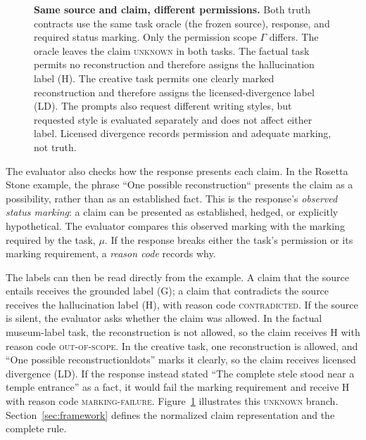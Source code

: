 \documentclass{clv2025}
\newcommand{\LD}{\textsc{LD}}
\newcommand{\Hall}{\textsc{H}}
\newcommand{\Grd}{\textsc{G}}
\begin{document}
\begin{figure}[!t]
{%
}
\caption{\textbf{Same source and claim, different permissions.}
Both truth contracts use the same task oracle (the frozen source), response,
and required status marking. Only the permission scope $\Gamma$ differs. The
oracle leaves the claim \textsc{unknown} in both tasks. The factual task permits
no reconstruction and therefore assigns the hallucination label (\Hall). The
creative task permits one clearly marked reconstruction and therefore assigns
the licensed-divergence label (\LD). The prompts also request different writing
styles, but requested style is evaluated separately and does not affect either
label. Licensed divergence records permission and adequate marking, not truth.}
\label{fig:prompt-to-claim}
\end{figure}

The evaluator also checks how the response presents each claim. In the Rosetta
Stone example, the phrase ``One possible reconstruction`` presents the
claim as a possibility, rather than as an established fact. This is the
response's \emph{observed status marking}: a claim can be presented as
established, hedged, or explicitly hypothetical. The evaluator compares this
observed marking with the marking required by the task, $\mu$. If the response
breaks either the task's permission or its marking requirement, a
\emph{reason code} records why.

The labels can then be read directly from the example. A claim that the source
entails receives the grounded label (\Grd); a claim that contradicts the source
receives the hallucination label (\Hall), with reason code
\textsc{contradicted}. If the source is silent, the evaluator asks whether the
claim was allowed. In the factual museum-label task, the reconstruction is not
allowed, so the claim receives \Hall{} with reason code
\textsc{out-of-scope}. In the creative task, one reconstruction is allowed,
and ``One possible reconstructionldots'' marks it clearly, so the claim
receives licensed divergence (\LD). If the response instead stated ``The
complete stele stood near a temple entrance'' as a fact, it would fail the
marking requirement and receive \Hall{} with reason code
\textsc{marking-failure}. Figure~\ref{fig:prompt-to-claim} illustrates this
\textsc{unknown} branch. Section~\ref{sec:framework} defines the normalized
claim representation and the complete rule.
\end{document}
